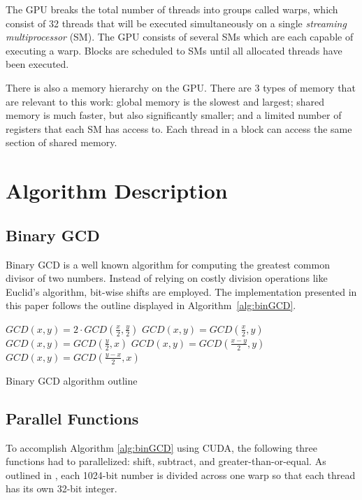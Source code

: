 \documentclass[12pt]{ucthesis}
\begin{document}
The GPU breaks the total number of threads into groups called warps, which 
consist of 32 threads that will be executed simultaneously on a single
\textit{streaming multiprocessor} (SM). The GPU consists of several SMs which 
are each capable of executing a warp. Blocks are scheduled to SMs until all 
allocated threads have been executed. 

There is also a memory hierarchy on the GPU. There are 3 types of memory 
that are relevant to this work: global memory is the slowest and 
largest; shared memory is much faster, but also significantly smaller; and 
a limited number of registers that each SM has access to. Each thread in a
block can access the same section of shared memory.

\section{Algorithm Description}
\label{sec:alg}
\subsection{Binary GCD}
\label{subsec:binGCD}
Binary GCD is a well known algorithm for computing the greatest common divisor 
of two numbers. Instead of relying on costly division operations like Euclid's 
algorithm, bit-wise shifts are employed. The implementation
presented in this paper follows the outline displayed in Algorithm~\ref{alg:binGCD}.

\begin{algorithm}
   \label{alg:binGCD}
   \nl{} {
      \nl{} {
         \nl$GCD(x, y) = 2 \cdot GCD(\frac{x}{2}, \frac{y}{2})$\;
      }\nl{} {
         \nl$GCD(x, y) = GCD(\frac{x}{2}, y)$\;
      }\nl{} {
         \nl$GCD(x, y) = GCD(\frac{y}{2}, x)$\;
      }\nl{} {
         \nl{} {
            \nl$GCD(x, y) = GCD(\frac{x - y}{2}, y)$\;
         }{
            \nl$GCD(x, y) = GCD(\frac{y - x}{2}, x)$\;
        }
      }
   }
   \caption{Binary GCD algorithm outline}
\end{algorithm}

\subsection{Parallel Functions}
\label{subsec:parfunc}
To accomplish Algorithm \ref{alg:binGCD} using CUDA, the following three 
functions had to parallelized: shift, subtract, and greater-than-or-equal. As 
outlined in \cite{fujimoto2009high}, each 1024-bit number is divided across one 
warp so that each thread has its own 32-bit integer. 
\end{document}
